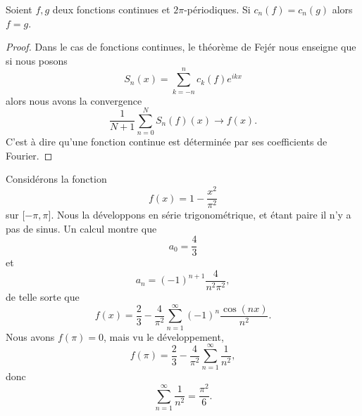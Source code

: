 \begin{corollary}   \label{CordgtXlC}
    Soient \( f,g\) deux fonctions continues et \( 2\pi\)-périodiques. Si \( c_n(f)=c_n(g)\) alors \( f=g\).
\end{corollary}

\begin{proof}
    Dans le cas de fonctions continues, le théorème de Fejér nous enseigne que si nous posons 
    \begin{equation}
        S_n(x)=\sum_{k=-n}^{n}c_k(f) e^{ikx}
    \end{equation}
    alors nous avons la convergence
    \begin{equation}
        \frac{1}{ N+1 }\sum_{n=0}^NS_n(f)(x)\to f(x).
    \end{equation}
    C'est à dire qu'une fonction continue est déterminée par ses coefficients de Fourier.
\end{proof}

\begin{example}
    Considérons la fonction
    \begin{equation}
        f(x)=1-\frac{ x^2 }{ \pi^2 }
    \end{equation}
    sur \( \mathopen[ -\pi , \pi \mathclose]\). Nous la développons en série trigonométrique, et étant paire il n'y a pas de sinus. Un calcul montre que
    \begin{equation}
        a_0=\frac{ 4 }{ 3 }
    \end{equation}
    et
    \begin{equation}
        a_n=(-1)^{n+1}\frac{ 4 }{ n^2\pi^2 },
    \end{equation}
    de telle sorte que
    \begin{equation}
        f(x)=\frac{ 2 }{ 3 }-\frac{ 4 }{ \pi^2 }\sum_{n=1}^{\infty}(-1)^n\frac{ \cos(nx) }{ n^2 }.
    \end{equation}
    Nous avons \( f(\pi)=0\), mais vu le développement,
    \begin{equation}
        f(\pi)=\frac{ 2 }{ 3 }-\frac{ 4 }{ \pi^2 }\sum_{n=1}^{\infty}\frac{1}{ n^2 },
    \end{equation}
    donc
    \begin{equation}
        \sum_{n=1}^{\infty}\frac{1}{ n^2 }=\frac{ \pi^2 }{ 6 }.
    \end{equation}
\end{example}

